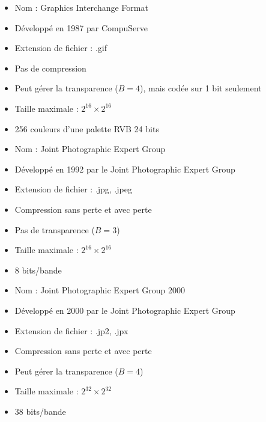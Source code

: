 \begin{description}[leftmargin=!, labelwidth=\widthof{\bfseries JPEG 2000}]
    \item[GIF] 
        \begin{itemize}
            \item Nom : Graphics Interchange Format
            \item Développé en 1987 par CompuServe
            \item Extension de fichier : .gif
            \item Pas de compression
            \item Peut gérer la transparence (\( B = 4 \)), mais codée sur 1 bit seulement
            \item Taille maximale : \( 2^{16} \times 2^{16} \)
            \item 256 couleurs d'une palette RVB 24 bits
        \end{itemize}
        
    \item[JPEG] 
        \begin{itemize}
            \item Nom : Joint Photographic Expert Group
            \item Développé en 1992 par le Joint Photographic Expert Group
            \item Extension de fichier : .jpg, .jpeg
            \item Compression sans perte et avec perte
            \item Pas de transparence (\( B = 3 \))
            \item Taille maximale : \( 2^{16} \times 2^{16} \)
            \item 8 bits/bande
        \end{itemize}
        
    \item[JPEG 2000] 
        \begin{itemize}
            \item Nom : Joint Photographic Expert Group 2000
            \item Développé en 2000 par le Joint Photographic Expert Group
            \item Extension de fichier : .jp2, .jpx
            \item Compression sans perte et avec perte
            \item Peut gérer la transparence (\( B = 4 \))
            \item Taille maximale : \( 2^{32} \times 2^{32} \)
            \item 38 bits/bande
        \end{itemize}
        

\end{description}
